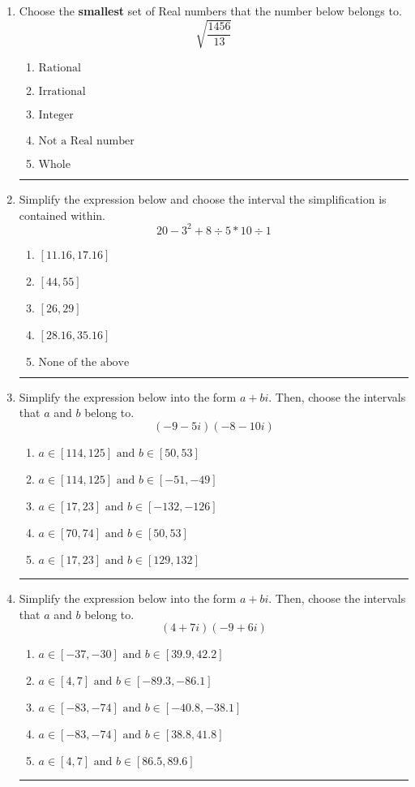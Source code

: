 \documentclass[14pt]{extbook}
\newcommand{\litem}[1]{\item#1\hspace*{-1cm}\rule{\textwidth}{0.4pt}}
\begin{document}
\begin{enumerate}
\litem{
Choose the \textbf{smallest} set of Real numbers that the number below belongs to.\[ \sqrt{\frac{1456}{13}} \]\begin{enumerate}[label=\Alph*.]
\item \( \text{Rational} \)
\item \( \text{Irrational} \)
\item \( \text{Integer} \)
\item \( \text{Not a Real number} \)
\item \( \text{Whole} \)

\end{enumerate} }
\litem{
Simplify the expression below and choose the interval the simplification is contained within.\[ 20 - 3^2 + 8 \div 5 * 10 \div 1 \]\begin{enumerate}[label=\Alph*.]
\item \( [11.16, 17.16] \)
\item \( [44, 55] \)
\item \( [26, 29] \)
\item \( [28.16, 35.16] \)
\item \( \text{None of the above} \)

\end{enumerate} }
\litem{
Simplify the expression below into the form $a+bi$. Then, choose the intervals that $a$ and $b$ belong to.\[ (-9 - 5 i)(-8 - 10 i) \]\begin{enumerate}[label=\Alph*.]
\item \( a \in [114, 125] \text{ and } b \in [50, 53] \)
\item \( a \in [114, 125] \text{ and } b \in [-51, -49] \)
\item \( a \in [17, 23] \text{ and } b \in [-132, -126] \)
\item \( a \in [70, 74] \text{ and } b \in [50, 53] \)
\item \( a \in [17, 23] \text{ and } b \in [129, 132] \)

\end{enumerate} }
\litem{
Simplify the expression below into the form $a+bi$. Then, choose the intervals that $a$ and $b$ belong to.\[ (4 + 7 i)(-9 + 6 i) \]\begin{enumerate}[label=\Alph*.]
\item \( a \in [-37, -30] \text{ and } b \in [39.9, 42.2] \)
\item \( a \in [4, 7] \text{ and } b \in [-89.3, -86.1] \)
\item \( a \in [-83, -74] \text{ and } b \in [-40.8, -38.1] \)
\item \( a \in [-83, -74] \text{ and } b \in [38.8, 41.8] \)
\item \( a \in [4, 7] \text{ and } b \in [86.5, 89.6] \)


\end{enumerate}}
\end{enumerate}
\end{document}
